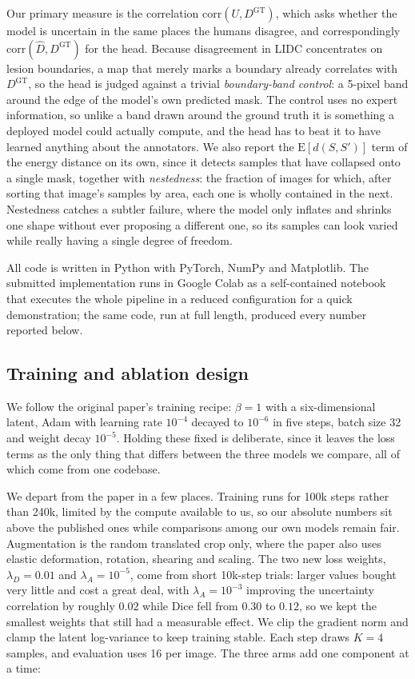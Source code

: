 \documentclass[10pt]{article}
\newcommand{\Dgt}{D^{\mathrm{GT}}}
\begin{document}
Our primary measure is the correlation $\mathrm{corr}(U,\Dgt)$, which asks
whether the model is uncertain in the same places the humans disagree, and
correspondingly $\mathrm{corr}(\hat D,\Dgt)$ for the head. Because disagreement
in LIDC concentrates on lesion boundaries, a map that merely marks a boundary
already correlates with $\Dgt$, so the head is judged against a trivial
\emph{boundary-band control}: a 5-pixel band around the edge of the model's own
predicted mask. The control
uses no expert information, so unlike a band drawn around the ground truth it is
something a deployed model could actually compute, and the head has to beat it to
have learned anything about the annotators. We also report the
$\mathrm{E}[d(S,S')]$ term of the energy distance on its own, since it detects
samples that have collapsed onto a single mask, together with \emph{nestedness}:
the fraction of images for which, after sorting that image's samples by area,
each one is wholly contained in the next. Nestedness catches a subtler failure,
where the model only inflates and shrinks one shape without ever proposing a
different one, so its samples can look varied while really having a single degree
of freedom.

All code is written in Python with PyTorch, NumPy and Matplotlib. The submitted
implementation runs in Google Colab as a self-contained notebook that executes
the whole pipeline in a reduced configuration for a quick demonstration; the same
code, run at full length, produced every number reported below.

\subsection{Training and ablation design}

We follow the original paper's training recipe: $\beta=1$ with a six-dimensional
latent, Adam with learning rate $10^{-4}$ decayed to $10^{-6}$ in five steps,
batch size 32 and weight decay $10^{-5}$. Holding these fixed is deliberate, since
it leaves the loss terms as the only thing that differs between the three models
we compare, all of which come from one codebase.

We depart from the paper in a few places. Training runs for 100k steps rather
than 240k, limited by the compute available to us, so our absolute numbers sit
above the published ones while comparisons among our own models remain fair.
Augmentation is the random translated crop only, where the paper also uses
elastic deformation, rotation, shearing and scaling. The two new loss weights,
$\lambda_D=0.01$ and $\lambda_A=10^{-5}$, come from short 10k-step trials: larger
values bought very little and cost a great deal, with $\lambda_A=10^{-3}$
improving the uncertainty correlation by roughly $0.02$ while Dice fell from
$0.30$ to $0.12$, so we kept the smallest weights that still had a measurable
effect. We clip the gradient norm and clamp the latent log-variance to keep
training stable. Each step draws $K=4$ samples, and evaluation uses 16 per image.
The three arms add one component at a time:
\end{document}
